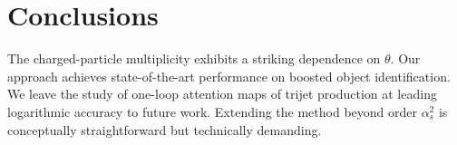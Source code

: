 \section{Conclusions}\label{sec:conclusions}

The charged-particle multiplicity exhibits a striking dependence on
$\theta$. Our approach achieves state-of-the-art performance on boosted
object identification. We leave the study of one-loop attention maps of
trijet production at leading logarithmic accuracy to future work.
Extending the method beyond order $\alpha_s^2$ is conceptually
straightforward but technically demanding.

